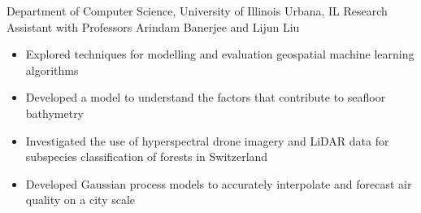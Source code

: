 
        {Department of Computer Science, University of Illinois}
        {Urbana, IL}
        {Research Assistant}
        {with Professors Arindam Banerjee and Lijun Liu}{
    \begin{itemize}
        \item Explored techniques for modelling and evaluation geospatial machine learning algorithms
        \item Developed a model to understand the factors that contribute to seafloor bathymetry
        \item Investigated the use of hyperspectral drone imagery and LiDAR data for subspecies classification of forests in Switzerland
        \item Developed Gaussian process models to accurately interpolate and forecast air quality on a city scale
    \end{itemize}
}
